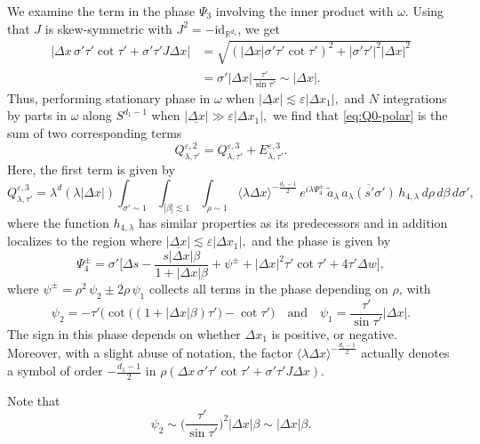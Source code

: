 \documentclass[leqno]{amsart}
\theoremstyle{definition}
\theoremstyle{remark}
\numberwithin{equation}{section}
\newcommand{\R}{\mathbb{R}}
\newcommand{\jp}[1]{\langle{#1}\rangle}
\newcommand\la{{\lambda}}
\newcommand\ve{{\varepsilon}}
\begin{document}
We  examine the term in the phase $\Psi_3$ involving the inner product with $\omega$. Using that $J$ is skew-symmetric with $ J^2 = - \mathrm{id}_{\R^{d_1}}$, we get
\begin{align*}
\bigl| \Delta x \, \sigma' \tau' \cot \tau' + \sigma' \tau' J\Delta x\bigr|& = \sqrt{\left( \left|\Delta x\right| \sigma' \tau' \cot \tau' \right)^2 + \left| \sigma'\tau'\right|^2\left|\Delta x\right|^2} \\
& = \sigma'\left|\Delta x\right| \frac{\tau'}{ \sin \tau' }\sim |\Delta x|.
\end{align*}
Thus, performing stationary phase in $\omega$ when $|\underline{\Delta x}|\lesssim \ve |\Delta x_1|,$   and $N$ integrations by parts in $\omega$ along $S^{d_1-1}$ when $|\underline{\Delta x}|\gg  \ve |\Delta x_1|,$ we find that  \eqref{eq:Q0-polar}
is the sum of two corresponding terms
\begin{equation}\label{eq:Q0-stat}
Q^{\varepsilon,2}_{\lambda,\tau'}=Q^{\varepsilon,3}_{\lambda,\tau'}+E^{\varepsilon,3}_{\lambda,\tau'}.
\end{equation}
Here, the first term is given by 
\begin{equation*}
Q^{\varepsilon,3}_{\lambda,\tau'}=\lambda^d (\la |\Delta x|) \int_{\sigma' \sim 1} \int_{|\beta|\lesssim 1} \int_{\rho \sim 1} \jp{\lambda\Delta x}^{-\frac{d_1-1}2} \, e^{i\lambda \Psi_4^\pm} \, \tilde a_\la  \,\overline{a_\lambda(s'\sigma')}\, h_{4,\lambda}\, d\rho \, d\beta \, d\sigma',
\end{equation*}
where the function $h_{4,\lambda}$ has similar properties as its predecessors and in addition localizes to the region where 
$|\underline{\Delta x}|\lesssim \ve |\Delta x_1|,$ and the  phase is given by
\[
\Psi_ 4 ^\pm = \sigma'\Big[\Delta s - \frac{s\left|\Delta x\right| \beta }{1 + \left|\Delta x\right|\beta} +\psi^\pm
 + \left|\Delta x\right|^2 \tau' \cot \tau' + 4 \tau' \Delta w\Big],
\]
where  $\psi^\pm=\rho^2\, \psi_2\pm 2\rho\, \psi_1$
collects all terms in the phase depending on $\rho$, with
\[
\psi_2  = - \tau' \big(\cot\big((1 + \left|\Delta x\right|\beta) \tau' \big)-\cot \tau' \big)
 \quad\text{and}\quad
\psi_1=  \frac{ \tau' }{\sin \tau' } \left|\Delta x\right|.
\]
The sign in this phase  depends on whether $\Delta x_1$ is positive, or negative. Moreover, with a slight abuse of notation, the factor ${\jp{\lambda\Delta x}^{-\frac{d_1-1}2}}$ actually denotes a symbol of order ${-\frac{d_1-1}{2}}$ in $\rho(\Delta x \, \sigma' \tau' \cot \tau' + \sigma' \tau' J \Delta x)$.

Note that
\[
\psi_2 \sim \Big(\frac{ \tau' }{\sin \tau' }\Big)^2 \left|\Delta x\right|\beta \sim \left|\Delta x\right|\beta.
\]
\end{document}
